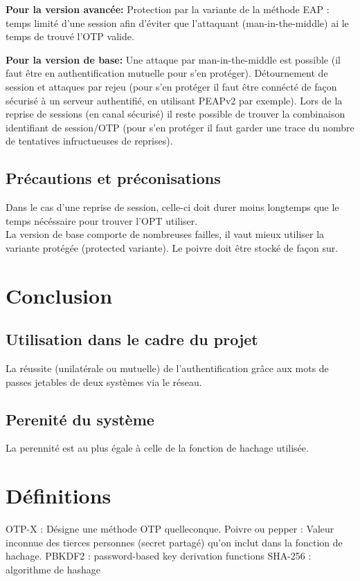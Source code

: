 \documentclass{article}
\begin{document}
   \textbf{ Pour la version avancée:}
    Protection par la variante de la méthode EAP : temps limité d'une session afin d'éviter que l'attaquant (man-in-the-middle) ai le temps de trouvé l'OTP valide.
    
    \textbf{Pour la version de base:}
    Une attaque par man-in-the-middle est possible (il faut être en authentification mutuelle pour s'en protéger).
    Détournement de session et attaques par rejeu (pour s'en protéger il faut être connécté de façon sécurisé à un serveur authentifié, en utilisant PEAPv2 par exemple).
    Lors de la reprise de sessions (en canal sécurisé) il reste possible de trouver la combinaison identifiant de session/OTP (pour s'en protéger il faut garder une trace du nombre de tentatives infructueuses de reprises).

\subsection{Précautions et préconisations}
    Dans le cas d'une reprise de session, celle-ci doit durer moins longtemps que le temps nécéssaire pour trouver l'OPT utiliser.\\
    La version de base comporte de nombreuses failles, il vaut mieux utiliser la variante protégée (protected variante).
    Le poivre doit être stocké de façon sur.

\section{Conclusion}

  \subsection{Utilisation dans le cadre du projet}
  La réussite (unilatérale ou mutuelle) de l'authentification grâce aux mots de passes jetables de deux systèmes via le réseau.
  
  \subsection{Perenité du système}
  La perennité est au plus égale à celle de la fonction de hachage utilisée.

\section{Définitions}
OTP-X : Désigne une méthode OTP quelleconque.
Poivre ou pepper : Valeur inconnue des tierces personnes (secret partagé) qu'on inclut dans la fonction de hachage.
PBKDF2 : password-based key derivation functions
SHA-256 : algorithme de hashage
\end{document}

